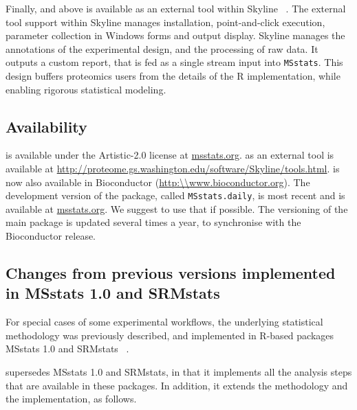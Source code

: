\documentclass[11pt]{article}
\begin{document}
Finally,  and above is available as an external tool within Skyline ~\citep{MacLean:2010hd}. The external tool support within Skyline manages \m installation, point-and-click execution, parameter collection in Windows forms and output display.  Skyline manages the annotations of the experimental design, and the processing of raw data. It outputs a custom report, that is fed as a single stream input into {\tt MSstats}.  This design buffers proteomics users from the details of the R implementation, while enabling rigorous statistical modeling. 


\subsection*{Availability}

\m is available under the Artistic-2.0 license at \url{msstats.org}. \m as an external tool is available at \url{http://proteome.gs.washington.edu/software/Skyline/tools.html}. \m is now also available in Bioconductor (\url{http:\\www.bioconductor.org}). The development version of the package, called {\tt MSstats.daily}, is most recent and is available at \url{msstats.org}. We suggest to use that if possible. The versioning of the main package is updated several times a year, to synchronise with the Bioconductor release.

\subsection*{Changes from previous versions implemented in MSstats 1.0 and SRMstats}

For special cases of some experimental workflows, the underlying statistical methodology was previously described, and implemented in R-based packages MSstats 1.0 and SRMstats ~\citep{Chang:2012uv,Clough:2012bc,Surinova:2013jk}. 


 supersedes MSstats 1.0 and SRMstats, in that it implements all the analysis steps that are available in these packages. In addition, it extends the methodology and the implementation, as follows.
\end{document}
